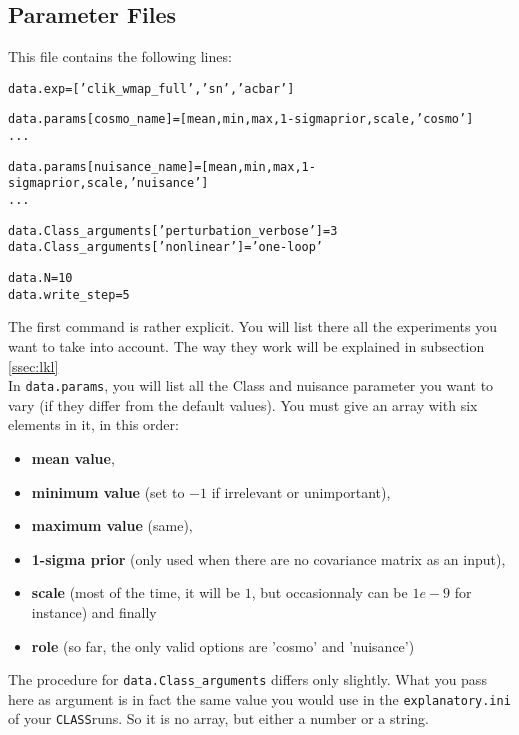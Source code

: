 \documentclass[10pt]{article}
\newcommand{\CLASS}{\texttt{CLASS}}
\begin{document}
  \subsection{Parameter Files}
  This file contains the following lines:

  \begin{alltt}
    data.exp = ['clik_wmap_full','sn','acbar']
    
    data.params[cosmo_name]       = [mean,min,max,1-sigma prior,scale,'cosmo']
    ...

    data.params[nuisance_name]    = [mean,min,max,1-sigma prior,scale,'nuisance']
    ...

    data.Class_arguments['perturbation_verbose'] = 3
    data.Class_arguments['non linear']           = 'one-loop'

    data.N = 10
    data.write_step = 5
  \end{alltt}

  The first command is rather explicit. You will list there all the experiments
  you want to take into account. The way they work will be explained in
  subsection \ref{ssec:lkl}\\

  In \verb?data.params?, you will list all the Class and nuisance parameter you
  want to vary (if they differ from the default values). You must give an array
  with six elements in it, in this order: 
  \begin{itemize}
    \item {\bf mean value}, 
    \item {\bf minimum value} (set to $-1$ if irrelevant or unimportant), 
    \item {\bf maximum value} (same), 
    \item {\bf 1-sigma prior} (only used when there are no covariance matrix as
      an input),
    \item {\bf scale} (most of the time, it will be $1$, but occasionnaly can
      be $1e-9$ for instance) and finally 
    \item {\bf role} (so far, the only valid options are 'cosmo' and
      'nuisance')
  \end{itemize}
  
  The procedure for \verb?data.Class_arguments? differs only slightly. What you
  pass here as argument is in fact the same value you would use in the
  \verb?explanatory.ini? of your \CLASS runs. So it is no array, but either a
  number or a string.\\
\end{document}
